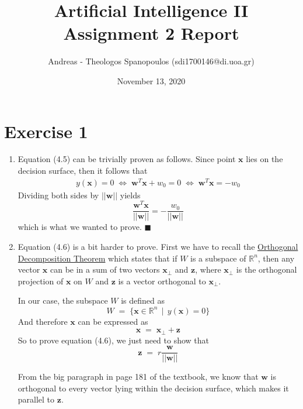 \documentclass[12pt]{report}
\title{Artificial Intelligence II \\ Assignment 2 Report}
\author{Andreas - Theologos Spanopoulos (sdi1700146@di.uoa.gr)}
\date{November 13, 2020}
\newcommand*{\QEDA}{\hfill\ensuremath{\blacksquare}}
\begin{document}
\maketitle

\section*{Exercise 1}
\begin{enumerate}
    \item Equation (4.5) can be trivially proven as follows. Since point $\textbf{x}$ lies
        on the decision surface, then it follows that
        \begin{align*}
            y(\textbf{x}) = 0 \;\Leftrightarrow\; \textbf{w}^T\textbf{x} + w_0 = 0 \;\Leftrightarrow\;
            \textbf{w}^T\textbf{x} = -w_0
        \end{align*}
        Dividing both sides by $||\textbf{w}||$ yields $$\frac{\textbf{w}^T\textbf{x}}{||\textbf{w}||}
        = -\frac{w_0}{||\textbf{w}||}$$
        which is what we wanted to prove. \QEDA
        \smallskip

    \item Equation (4.6) is a bit harder to prove. First we have to recall the
        \href{https://mathworld.wolfram.com/OrthogonalDecomposition.html}{Orthogonal
        Decomposition Theorem} which states that if $W$ is a subspace of $\mathbb{R}^n$, then any
        vector $\textbf{x}$ can be  in a sum of two vectors
        $\textbf{x}_{\perp}$ and $\textbf{z}$, where $\textbf{x}_{\perp}$ is the
        orthogonal projection of $\textbf{x}$ on $W$ and $\textbf{z}$ is a vector orthogonal
        to $\textbf{x}_{\perp}$.

        In our case, the subspace $W$ is defined as
        $$W \;=\; \{\textbf{x} \in \mathbb{R}^n\;\,|\;\, y(\textbf{x}) = 0\}$$
        And therefore $\textbf{x}$ can be expressed as
        $$\textbf{x} \;=\; \textbf{x}_{\perp} + \textbf{z}$$
        So to prove equation (4.6), we just need to show that
        \begin{equation}
            \textbf{z} \;=\; r \frac{\textbf{w}}{||\textbf{w}||}  
        \end{equation}

        From the big paragraph in page 181 of the 
        textbook, we know that $\textbf{w}$ is orthogonal to every vector lying within the decision
        surface, which makes it parallel to $\textbf{z}$.


\end{enumerate}
\end{document}
